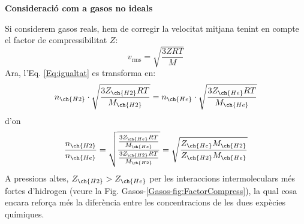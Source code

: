 {%
\textbf{Consideració com a gasos no ideals}

Si considerem gasos reals, hem de corregir la velocitat mitjana tenint en compte el factor de compressibilitat $Z$:
\begin{equation}
    v_{\text{rms}} = \sqrt{\frac{3ZRT}{M}}
\end{equation}
Ara, l'Eq. \ref{Eq:igualtat} es transforma en:
\[
    n_{\ch{H2}} \cdot \sqrt{\frac{3Z_{\ch{H2}}RT}{M_{\ch{H2}}}} = n_{\ch{He}} \cdot \sqrt{\frac{3Z_{\ch{He}}RT}{M_{\ch{He}}}}
\]
d'on
\[
    \frac{n_{\ch{H2}}}{n_{\ch{He}}}=\sqrt{\frac{\frac{3Z_{\ch{He}}RT}{M_{\ch{He}}}}{\frac{3Z_{\ch{H2}}RT}{M_{\ch{H2}}}}}
    =\sqrt{\frac{Z_{\ch{He}}M_{\ch{H2}}}{Z_{\ch{H2}}M_{\ch{He}}}}
\]
A pressions altes, $Z_{\ch{H2}} > Z_{\ch{He}}$ per les interaccions intermoleculars més fortes d'hidrogen (veure la Fig. Gasos-\ref{Gasos-fig:FactorCompress}), la qual cosa encara reforça més la diferència entre les concentracions de les dues expècies químiques. 
}

